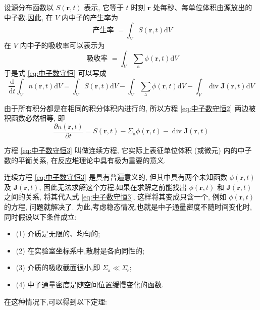 \documentclass{Sichuan Normal University}
\begin{document}
设源分布函数以 $S(\boldsymbol{r}, t)$ 表示, 它等于 $t$ 时刻 $\boldsymbol{r}$ 处每秒、每单位体积由源放出的中子数.因此, 在 $V$ 内中子的产生率为
\begin{equation}
    \text { 产生率 }=\int_V S(\boldsymbol{r}, t) \mathrm{d} V
    \label{eq:产生率}
\end{equation}
在 $V$ 内中子的吸收率可以表示为
\begin{equation}
    \text { 吸收率 }=\int_V \sum_{\mathrm{a}} \phi(\boldsymbol{r}, t) \mathrm{d} V
    \label{eq:吸收率}
\end{equation}
于是式 \eqref{eq:中子数守恒} 可以写成
\begin{equation}
    \frac{\mathrm{d}}{\mathrm{d} t} \int_V n(\boldsymbol{r}, t) \mathrm{d} V=\int_V S(\boldsymbol{r}, t) \mathrm{d} V-\int_V \sum_{\mathrm{a}} \phi(\boldsymbol{r}, t) \mathrm{d} V-\int_V \operatorname{div} \boldsymbol{J}(\boldsymbol{r}, t) \mathrm{d} V
    \label{eq:中子数守恒2}
\end{equation}

由于所有积分都是在相同的积分体积内进行的, 所以方程 \eqref{eq:中子数守恒2} 两边被积函数必然相等, 即
\begin{equation}
    \frac{\partial n(\boldsymbol{r}, t)}{\partial t}=S(\boldsymbol{r}, t)-\Sigma_{\mathrm{a}} \phi(\boldsymbol{r}, t)-\operatorname{div} \boldsymbol{J}(\boldsymbol{r}, t)
    \label{eq:中子数守恒3}
\end{equation}

方程 \eqref{eq:中子数守恒3} 叫做连续方程, 它实际上表征单位体积 (或微元) 内的中子数的平衡关系, 在反应堆理论中具有极为重要的意义.

连续方程 \eqref{eq:中子数守恒3} 是具有普遍意义的, 但其中具有两个未知函数 $\phi(\boldsymbol{r}, t)$ 及 $\boldsymbol{J}(\boldsymbol{r}, t)$, 
因此无法求解这个方程.如果在求解之前能找出 $\phi(\boldsymbol{r}, t)$ 和 $\boldsymbol{J}(\boldsymbol{r}, t)$ 之间的关系, 将其代入式 \eqref{eq:中子数守恒3}, 这样将其变成只含一个, 例如 $\phi(\boldsymbol{r}, t)$ 的方程, 问题就解决了.
为此,考虑稳态情况,也就是中子通量密度不随时间变化时,同时假设以下条件成立:
    \begin{itemize}
        \item[] \hspace{1mm}(1) 介质是无限的、均匀的;
        \item[] \hspace{1mm}(2) 在实验室坐标系中,散射是各向同性的;
        \item[] \hspace{1mm}(3) 介质的吸收截面很小,即 $\Sigma_{\mathrm{a}} \ll \Sigma_{\mathrm{s}}$;
        \item[] \hspace{1mm}(4) 中子通量密度是随空间位置缓慢变化的函数.
    \end{itemize}
在这种情况下,可以得到以下定理:
\end{document}
